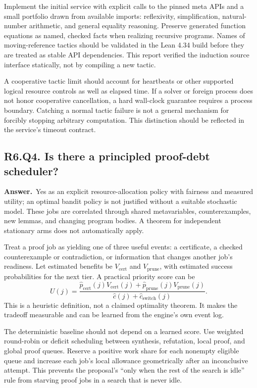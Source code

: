 \documentclass[11pt,a4paper]{article}
\theoremstyle{definition}
\theoremstyle{remark}
\newcommand{\answer}{\par\noindent\textbf{Answer.}\ }
\newcommand{\qheading}[2]{\subsection{#1. #2}}
\begin{document}
Implement the initial service with explicit calls to the pinned meta APIs and
a small portfolio drawn from available imports: reflexivity, simplification,
natural-number arithmetic, and general equality reasoning. Preserve generated
function equations as named, checked facts when realizing recursive programs.
Names of moving-reference tactics should be validated in the Lean 4.34 build
before they are treated as stable API dependencies. This report verified the
induction source interface statically, not by compiling a new tactic.

A cooperative tactic limit should account for heartbeats or other supported
logical resource controls as well as elapsed time. If a solver or foreign
process does not honor cooperative cancellation, a hard wall-clock guarantee
requires a process boundary. Catching a normal tactic failure is not a general
mechanism for forcibly stopping arbitrary computation. This distinction should
be reflected in the service's timeout contract.

\qheading{R6.Q4}{Is there a principled proof-debt scheduler?}
\answer Yes as an explicit resource-allocation policy with fairness and measured
utility; an optimal bandit policy is not justified without a suitable stochastic
model. These jobs are correlated through shared metavariables, counterexamples,
new lemmas, and changing program bodies. A theorem for independent stationary
arms does not automatically apply.

Treat a proof job as yielding one of three useful events: a certificate, a
checked counterexample or contradiction, or information that changes another
job's readiness. Let estimated benefits be $V_{\mathrm{cert}}$ and
$V_{\mathrm{prune}}$, with estimated success probabilities for the next tier.
A practical priority score can be
\[
 U(j)=\frac{\widehat p_{\mathrm{cert}}(j)V_{\mathrm{cert}}(j)
       +\widehat p_{\mathrm{prune}}(j)V_{\mathrm{prune}}(j)}
       {\widehat c(j)+\widehat c_{\mathrm{switch}}(j)}.
 \tag{17}
\]
This is a heuristic definition, not a claimed optimality theorem. It makes the
tradeoff measurable and can be learned from the engine's own event log.

The deterministic baseline should not depend on a learned score. Use weighted
round-robin or deficit scheduling between synthesis, refutation, local proof,
and global proof queues. Reserve a positive work share for each nonempty
eligible queue and increase each job's local allowance geometrically after an
inconclusive attempt. This prevents the proposal's ``only when the rest of the
search is idle'' rule from starving proof jobs in a search that is never idle.
\end{document}
